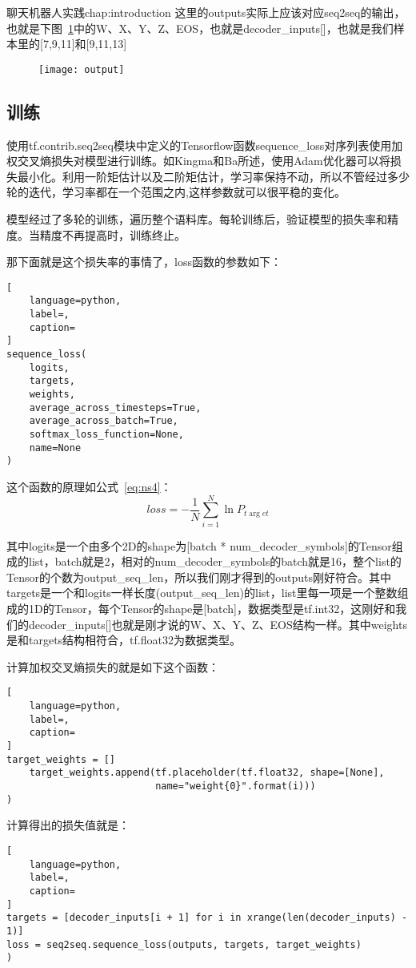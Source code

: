 \begin{cuzchapter}{聊天机器人实践}{chap:introduction}
这里的outputs实际上应该对应seq2seq的输出，也就是下图~\ref{output}中的W、X、Y、Z、EOS，也就是decoder\_inputs[]，也就是我们样本里的[7,9,11]和[9,11,13]
\begin{figure}[!htbp]
    \centering
    \texttt{[image: output]}
    \caption[output]{}
    \label{output}
\end{figure}
\subsection{训练}\label{sec:background}
使用tf.contrib.seq2seq模块中定义的Tensorflow函数sequence\_loss对序列表使用加权交叉熵损失对模型进行训练。如Kingma和Ba\cite{DBLP:journals/corr/Adam}所述，使用Adam优化器可以将损失最小化。利用一阶矩估计以及二阶矩估计，学习率保持不动，所以不管经过多少轮的迭代，学习率都在一个范围之内,这样参数就可以很平稳的变化。

模型经过了多轮的训练，遍历整个语料库。每轮训练后，验证模型的损失率和精度。当精度不再提高时，训练终止。

那下面就是这个损失率的事情了，loss函数的参数如下：
\begin{lstlisting}[
    language=python,
    label=,
    caption=
]
sequence_loss(
    logits,
    targets,
    weights,
    average_across_timesteps=True,
    average_across_batch=True,
    softmax_loss_function=None,
    name=None
)
\end{lstlisting}

这个函数的原理如公式~\ref{eq:ns4}：
\begin{equation}
    \label{eq:ns4}
    loss=-\dfrac {1}{N}\sum ^{N}_{i=1}\ln P_{t\arg et}  
\end{equation}

其中logits是一个由多个2D的shape为[batch * num\_decoder\_symbols]的Tensor组成的list，batch就是2，相对的num\_decoder\_symbols的batch就是16，整个list的Tensor的个数为output\_seq\_len，所以我们刚才得到的outputs刚好符合。其中targets是一个和logits一样长度(output\_seq\_len)的list，list里每一项是一个整数组成的1D的Tensor，每个Tensor的shape是[batch]，数据类型是tf.int32，这刚好和我们的decoder\_inputs[]也就是刚才说的W、X、Y、Z、EOS结构一样。其中weights是和targets结构相符合，tf.float32为数据类型。

计算加权交叉熵损失的就是如下这个函数：
\begin{lstlisting}[
    language=python,
    label=,
    caption=
]
target_weights = []
    target_weights.append(tf.placeholder(tf.float32, shape=[None], 
                          name="weight{0}".format(i)))
)
\end{lstlisting}
计算得出的损失值就是：
\begin{lstlisting}[
    language=python,
    label=,
    caption=
]
targets = [decoder_inputs[i + 1] for i in xrange(len(decoder_inputs) - 1)]
loss = seq2seq.sequence_loss(outputs, targets, target_weights)
)
\end{lstlisting}


\end{cuzchapter}
